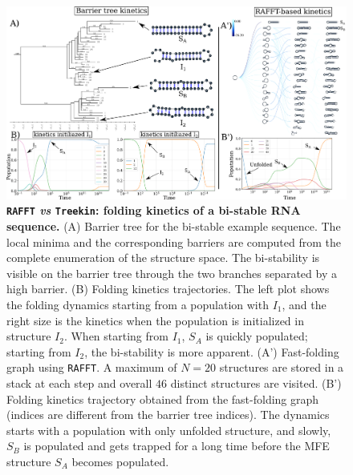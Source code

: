 \begin{figure}[t]
	\centering
	\includegraphics[width=0.9\linewidth]{../res/images/rafft/kine_bi_sta.png}
	\caption{\label{class_examp}\textbf{\texttt{RAFFT} \emph{vs} \texttt{Treekin}: folding kinetics of a bi-stable \ac{RNA} sequence.} (A) Barrier tree for the bi-stable example sequence. The local minima and the corresponding barriers are computed from the complete enumeration of the structure space. The bi-stability is visible on the barrier tree through the two branches separated by a high barrier.  (B) Folding kinetics trajectories. The left plot shows the folding dynamics starting from a population with $I_1$, and the right size is the kinetics when the population is initialized in structure $I_2$. When starting from $I_1$, $S_A$ is quickly populated; starting from $I_2$, the bi-stability is more apparent.  (A') Fast-folding graph using \texttt{RAFFT}. A maximum of $N=20$ structures are stored in a stack at each step and overall $46$ distinct structures are visited. (B') Folding kinetics trajectory obtained from the fast-folding graph (indices are different from the barrier tree indices). The dynamics starts with a population with only unfolded structure, and slowly, $S_B$ is populated and gets trapped for a long time before the \ac{MFE} structure $S_A$ becomes populated.}
\end{figure}
